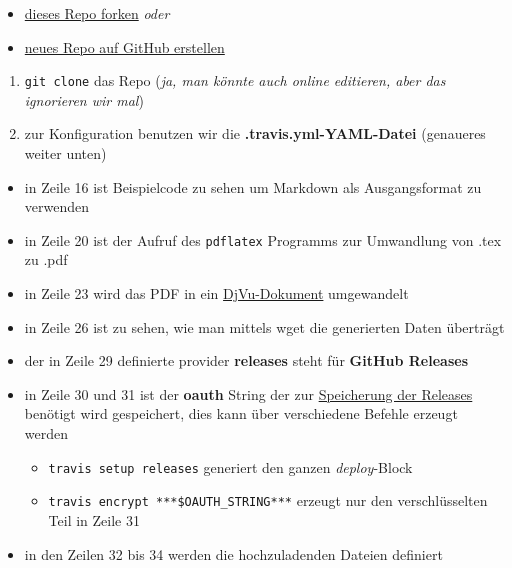 \documentclass[]{article}
\providecommand{\tightlist}{
  \setlength{\itemsep}{0pt}\setlength{\parskip}{0pt}}
\begin{document}
\begin{itemize}
\tightlist
\item
  \href{https://github.com/SimonWaldherr/golang-examples\#fork-destination-box}{dieses
  Repo forken} \emph{oder}
\item
  \href{https://github.com/new}{neues Repo auf GitHub erstellen}
\end{itemize}

\begin{enumerate}
\def\labelenumi{\arabic{enumi}.}
\tightlist
\item
  \texttt{git\ clone} das Repo (\emph{ja, man könnte auch online
  editieren, aber das ignorieren wir mal})
\item
  zur Konfiguration benutzen wir die \textbf{.travis.yml-YAML-Datei}
  (genaueres weiter unten)
\end{enumerate}

\begin{itemize}
\tightlist
\item
  in Zeile 16 ist Beispielcode zu sehen um Markdown als Ausgangsformat
  zu verwenden
\item
  in Zeile 20 ist der Aufruf des \texttt{pdflatex} Programms zur
  Umwandlung von .tex zu .pdf
\item
  in Zeile 23 wird das PDF in ein
  \href{https://de.wikipedia.org/wiki/DjVu}{DjVu-Dokument} umgewandelt
\item
  in Zeile 26 ist zu sehen, wie man mittels wget die generierten Daten
  überträgt
\item
  der in Zeile 29 definierte provider \textbf{releases} steht für
  \textbf{GitHub Releases}
\item
  in Zeile 30 und 31 ist der \textbf{oauth} String der zur
  \href{http://docs.travis-ci.com/user/deployment/releases/}{Speicherung
  der Releases} benötigt wird gespeichert, dies kann über verschiedene
  Befehle erzeugt werden

  \begin{itemize}
  \tightlist
  \item
    \texttt{travis\ setup\ releases} generiert den ganzen
    \emph{deploy}-Block
  \item
    \texttt{travis\ encrypt\ ***\$OAUTH\_STRING***} erzeugt nur den
    verschlüsselten Teil in Zeile 31
  \end{itemize}
\item
  in den Zeilen 32 bis 34 werden die hochzuladenden Dateien definiert
\end{itemize}
\end{document}
